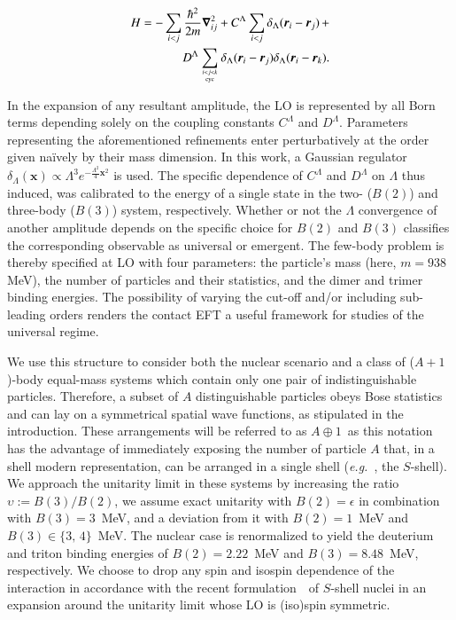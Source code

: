 \documentclass[preprint,12pt]{elsarticle}
\newcommand{\abb}{\mbox{\ensuremath{A\oplus 1}}}
\newcommand{\lec}{C^\Lambda}
\newcommand{\led}{D^\Lambda}
\newcommand{\eg}{\textit{e.g.}~}
\newcommand{\ve}[1]{\ensuremath{\boldsymbol{#1}}}
\begin{document}
\begin{align}
H = - \sum_{i<j} \frac{\hbar^2}{2m}\ve{\nabla}_{ij}^2+ \lec \sum_{i<j}{\delta_\Lambda(\ve{r}_i-\ve{r}_j)} 
\,+\nonumber\\
\led \sum_{ i<j<k \atop \text{cyc} }\delta_\Lambda(\ve{r}_i-\ve{r}_j)\delta_\Lambda(\ve{r}_i-\ve{r}_k).
\label{eq:hamiltonian}
\end{align}

In the expansion of any resultant amplitude, the LO is represented by all Born
terms depending solely on the coupling constants $\lec$ and $\led$. 
Parameters representing the aforementioned refinements
enter perturbatively at the order given na\"ively by their mass
dimension. 
In this work, a Gaussian regulator 
\mbox{$\delta_\Lambda(\ve{x}) \propto\Lambda^3 e^{-\frac{\Lambda^2}{4}\ve{x}^2}$} is used.
The specific dependence of $\lec$ and $\led$ on $\Lambda$ thus induced, was calibrated to
the energy of a single state in the two- ($B(2)$) and three-body
($B(3)$) system, respectively.
Whether or not the $\Lambda$ convergence of another amplitude depends on the
specific choice for $B(2)$ and $B(3)$ classifies the corresponding observable as
universal or emergent.
The few-body problem is thereby specified at LO with four parameters: the particle's mass
(here, $m=938~$MeV), the number of particles and their statistics,
and the dimer and trimer binding energies.
The possibility of varying the cut-off and/or including sub-leading orders renders the contact EFT
a useful framework for studies of the universal regime.

We use this structure to consider both the nuclear scenario and a class of ($A+1$)-body equal-mass systems which contain only one pair of 
indistinguishable particles. Therefore, a subset of $A$ distinguishable particles obeys Bose statistics and can lay on a symmetrical
spatial wave functions, as stipulated in the introduction.
These arrangements will be referred to as \abb~as this notation has the advantage of immediately exposing the number of particle $A$ that, in a shell modern representation, can be arranged in a single shell (\eg , the $S$-shell).
We approach the unitarity limit in these systems by increasing the ratio \mbox{$\upsilon:=B(3)/B(2)$},
we assume exact unitarity with $B(2)=\epsilon$ in combination with $B(3)=3$~MeV, and a deviation from it with $B(2)=1$~MeV and $B(3)\in\lbrace3,\,4\rbrace$~MeV.
The nuclear case is renormalized to yield the deuterium and triton binding energies of $B(2)=2.22$~MeV and $B(3)=8.48$~MeV, respectively. 
We choose to drop any spin and isospin dependence of the interaction in accordance with the recent formulation~\cite{Konig:2016utl}~of
 $S$-shell nuclei in an expansion around the unitarity limit whose LO is (iso)spin symmetric.
\end{document}
